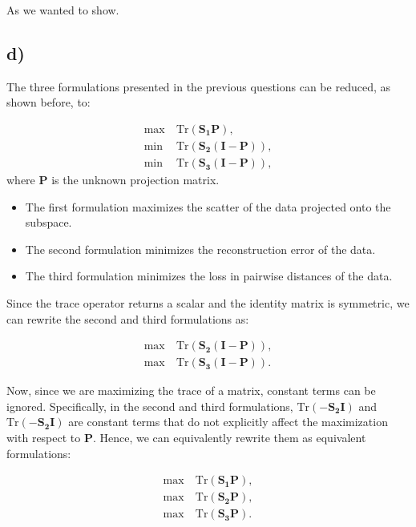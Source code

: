 \documentclass[12pt,a4paper,oneside]{paper}
\begin{document}
As we wanted to show.

\newpage
\subsection*{d)}

The three formulations presented in the previous questions can be reduced, as shown before, to:

\[
\begin{aligned}
    \max &\ \text{Tr}(\bm{S_1} \bm{P}), \\
    \min &\ \text{Tr}(\bm{S_2}  (\bm{I} - \bm{P})), \\
    \min &\ \text{Tr}(\bm{S_3}  (\bm{I} - \bm{P})),
\end{aligned}
\]
where \( \bm{P} \) is the unknown projection matrix. 

\begin{itemize}
    \item The first formulation maximizes the scatter of the data projected onto the subspace.
    \item The second formulation minimizes the reconstruction error of the data.
    \item The third formulation minimizes the loss in pairwise distances of the data.
\end{itemize}

Since the trace operator returns a scalar and the identity matrix is symmetric, we can rewrite the second and third formulations as:

\[
\begin{aligned}
    \max &\ \text{Tr}(\bm{S_2}  (\bm{I} - \bm{P})), \\
    \max &\ \text{Tr}(\bm{S_3}  (\bm{I} - \bm{P})).
\end{aligned}
\]

Now, since we are maximizing the trace of a matrix, constant terms can be ignored. Specifically, in the second and third formulations, \( \text{Tr}(-\bm{S_2} \bm{I}) \) and \( \text{Tr}(-\bm{S_2} \bm{I}) \) are constant terms that do not explicitly affect the maximization with respect to \( \bm{P} \). Hence, we can equivalently rewrite them as equivalent formulations:

\[
\begin{aligned}
    \max &\ \text{Tr}(\bm{S_1} \bm{P}), \\
    \max &\ \text{Tr}(\bm{S_2} \bm{P}), \\
    \max &\ \text{Tr}(\bm{S_3} \bm{P}).
\end{aligned}
\]
\end{document}
